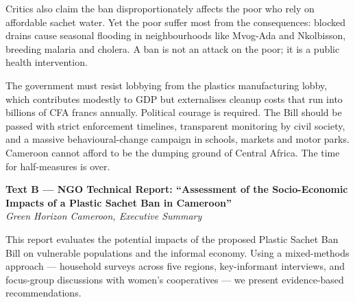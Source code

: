 \documentclass[11pt]{article}
\begin{document}
Critics also claim the ban disproportionately affects the poor who rely on affordable sachet water. Yet the poor suffer most from the consequences: blocked drains cause seasonal flooding in neighbourhoods like Mvog-Ada and Nkolbisson, breeding malaria and cholera. A ban is not an attack on the poor; it is a public health intervention.

The government must resist lobbying from the plastics manufacturing lobby, which contributes modestly to GDP but externalises cleanup costs that run into billions of CFA francs annually. Political courage is required. The Bill should be passed with strict enforcement timelines, transparent monitoring by civil society, and a massive behavioural-change campaign in schools, markets and motor parks. Cameroon cannot afford to be the dumping ground of Central Africa. The time for half-measures is over.

\textbf{Text B --- NGO Technical Report: ``Assessment of the Socio-Economic Impacts of a Plastic Sachet Ban in Cameroon''} \\
\textit{Green Horizon Cameroon, Executive Summary}

This report evaluates the potential impacts of the proposed Plastic Sachet Ban Bill on vulnerable populations and the informal economy. Using a mixed-methods approach --- household surveys across five regions, key-informant interviews, and focus-group discussions with women's cooperatives --- we present evidence-based recommendations.
\end{document}
